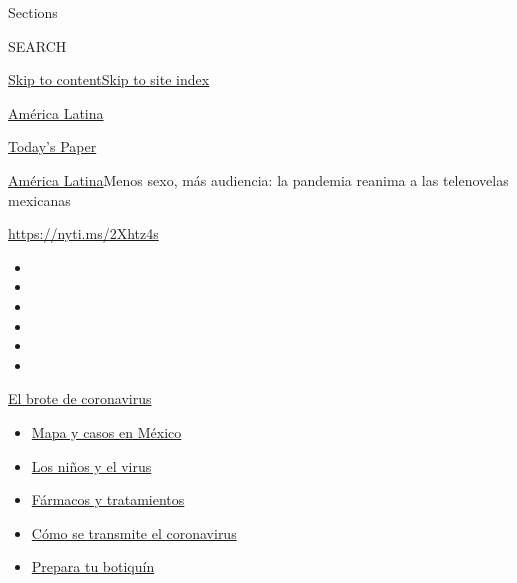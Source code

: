 Sections

SEARCH

\protect\hyperlink{site-content}{Skip to
content}\protect\hyperlink{site-index}{Skip to site index}

\href{https://www.nytimes3xbfgragh.onion/es/section/america-latina}{América
Latina}

\href{https://myaccount.nytimes3xbfgragh.onion/auth/login?response_type=cookie\&client_id=vi}{}

\href{https://www.nytimes3xbfgragh.onion/section/todayspaper}{Today's
Paper}

\href{/es/section/america-latina}{América Latina}\textbar{}Menos sexo,
más audiencia: la pandemia reanima a las telenovelas mexicanas

\url{https://nyti.ms/2Xhtz4s}

\begin{itemize}
\item
\item
\item
\item
\item
\item
\end{itemize}

\href{https://www.nytimes3xbfgragh.onion/es/spotlight/coronavirus?action=click\&pgtype=Article\&state=default\&region=TOP_BANNER\&context=storylines_menu}{El
brote de coronavirus}

\begin{itemize}
\tightlist
\item
  \href{https://www.nytimes3xbfgragh.onion/es/interactive/2020/espanol/america-latina/coronavirus-en-mexico.html?action=click\&pgtype=Article\&state=default\&region=TOP_BANNER\&context=storylines_menu}{Mapa
  y casos en México}
\item
  \href{https://www.nytimes3xbfgragh.onion/es/2020/07/31/espanol/ciencia-y-tecnologia/ninos-contagio-coronavirus.html?action=click\&pgtype=Article\&state=default\&region=TOP_BANNER\&context=storylines_menu}{Los
  niños y el virus}
\item
  \href{https://www.nytimes3xbfgragh.onion/es/interactive/2020/science/coronavirus-tratamientos-curas.html?action=click\&pgtype=Article\&state=default\&region=TOP_BANNER\&context=storylines_menu}{Fármacos
  y tratamientos}
\item
  \href{https://www.nytimes3xbfgragh.onion/es/2020/07/06/espanol/ciencia-y-tecnologia/coronavirus-transmision-aire.html?action=click\&pgtype=Article\&state=default\&region=TOP_BANNER\&context=storylines_menu}{Cómo
  se transmite el coronavirus}
\item
  \href{https://www.nytimes3xbfgragh.onion/es/2020/07/14/espanol/estilos-de-vida/botiquin-medicina-coronavirus.html?action=click\&pgtype=Article\&state=default\&region=TOP_BANNER\&context=storylines_menu}{Prepara
  tu botiquín}
\end{itemize}

